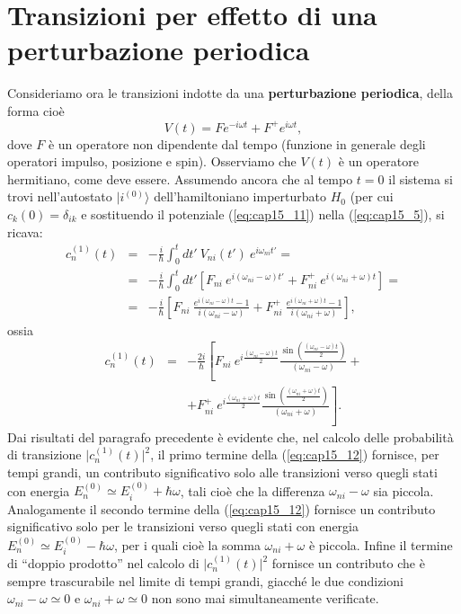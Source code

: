 \documentclass[a4paper,12pt,oneside]{book}
\begin{document}
\section{Transizioni per effetto di una perturbazione periodica}
Consideriamo ora le transizioni indotte da una \textbf{perturbazione periodica}, della forma cioè
\begin{equation}
V(t) = Fe^{-i\omega t} + F^+ e ^{i\omega t},
\label{eq:cap15_11}
\end{equation}
dove $F$ è un operatore non dipendente dal tempo (funzione in generale degli operatori impulso, posizione e spin). Osserviamo che $V(t)$ è un operatore hermitiano, come deve essere.		
Assumendo ancora che al tempo $t=0$ il sistema si trovi nell'autostato $\vert i ^{(0)}\rangle$ dell'hamiltoniano imperturbato $H_0$ (per cui $c_k (0) = \delta _{ik}$ e sostituendo il potenziale (\ref{eq:cap15_11}) nella (\ref{eq:cap15_5}), si ricava:
\begin{eqnarray}
c_n ^{(1)}(t) & = & -\frac{i}{\hbar}\int _0 ^t dt'\ V_{ni} (t') \ e^{i\omega _{ni}t'} = \nonumber \\
&=& -\frac{i}{\hbar}\int _0 ^t dt'\left[ F_{ni}\ e^{i(\omega _{ni}-\omega) t'} + F_{ni} ^+\ e ^{i(\omega _{ni} +\omega) t}\right] = \nonumber \\
&=& -\frac{i}{\hbar}\left[ F_{ni}\ \frac{e^{i(\omega _{ni}-\omega) t}-1}{i(\omega _{ni}-\omega)} + F_{ni} ^+\ \frac{e ^{i(\omega _{ni} +\omega) t}-1}{i(\omega _{ni}+\omega)}\right], 
\end{eqnarray}
ossia
\begin{eqnarray}
c_n ^{(1)}(t)&=&-\frac{2i}{\hbar}\left[ F_{ni}\ e^{i\frac{(\omega _{ni}-\omega) t}{2}}\frac{\sin(\frac{(\omega _{ni}-\omega) t}{2})}{(\omega _{ni}-\omega)} +\right. \nonumber \\
& &\left. + F_{ni} ^+\ e^{i\frac{(\omega _{ni}+\omega) t}{2}}\frac{\sin(\frac{(\omega _{ni}+\omega) t}{2})}{(\omega _{ni}+\omega)}\right].
\label{eq:cap15_12}
\end{eqnarray}
Dai risultati del paragrafo precedente è evidente che, nel calcolo delle probabilità di transizione $\vert c_n ^{(1)}(t)\vert ^2$, il primo termine della (\ref{eq:cap15_12}) fornisce, per tempi grandi, un contributo significativo solo alle transizioni verso quegli stati con energia $E_n ^{(0)} \simeq E_i ^{(0)}+ \hbar \omega $, tali cioè che la differenza  $\omega _{ni} - \omega$ sia piccola. Analogamente il secondo termine della (\ref{eq:cap15_12}) fornisce un contributo significativo solo per le transizioni verso quegli stati con energia  $E_n ^{(0)} \simeq E_i ^{(0)}- \hbar \omega $, per i quali cioè la somma $\omega _{ni} + \omega$ è piccola. Infine  il termine di ``doppio prodotto'' nel calcolo di  $\vert c_n ^{(1)}(t)\vert ^2$ fornisce un contributo che è sempre trascurabile nel limite di tempi grandi, giacché le due condizioni $\omega _{ni} - \omega\simeq 0$ e $\omega _{ni} + \omega\simeq 0$ non sono mai simultaneamente verificate.\\
\end{document}
